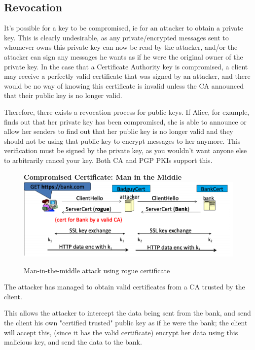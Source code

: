\documentclass[11pt]{article} %
\begin{document}
{\subsection{Revocation}
It's possible for a key to be compromised, ie for an attacker to obtain a private key. This is clearly undesirable, as any private/encrypted messages sent to whomever owns this private key can now be read by the attacker, and/or the attacker can sign any messages he wants as if he were the original owner of the private key. In the case that a Certificate Authority key is compromised, a client may receive a perfectly valid certificate that was signed by an attacker, and there would be no way of knowing this certificate is invalid unless the CA announced that their public key is no longer valid.

\bigskip
Therefore, there exists a revocation process for public keys. If Alice, for example, finds out that her private key has been compromised, she is able to announce or allow her senders to find out that her public key is no longer valid and they should not be using that public key to encrypt messages to her anymore. This verification must be signed by the private key, as you wouldn't want anyone else to arbitrarily cancel your key. Both CA and PGP PKIs support this. 
\begin{figure}
    \centering
    \textbf{Compromised Certificate: Man in the Middle}
    \includegraphics[scale=.4]{./cert3.png}
    \caption{Man-in-the-middle attack using rogue certificate}

\end{figure}

\bigskip
{\parindent0pt The attacker has managed to obtain valid certificates from a CA 
trusted by the client.}

\bigskip
{\parindent0pt This allows the attacker to intercept the data being sent from the
bank, and send the client his own "certified trusted" public key as if 
he were the bank; the client will accept this, (since it has the valid 
certificate) encrypt her data using this malicious key, and send the 
data to the bank.}

}
\end{document}
